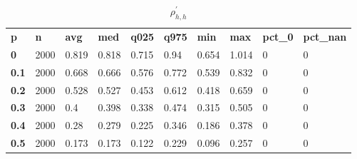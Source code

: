 \begin{table}[h]
 \centering 
\footnotesize
\caption{$\rho_{h,h}^\prime $}
\label{tab:alphahh}
\begin{tabular}[h]{| l l l l l l l l l l|
    } \hline
\textbf{ p} & \textbf{ n} & \textbf{ avg} & \textbf{ med} & \textbf{ q025} & \textbf{ q975} & \textbf{ min} & \textbf{ max} & \textbf{ pct\_0} & \textbf{ pct\_nan}
           \\
  \textbf{  0} & 2000 & 0.819 & 0.818 & 0.715 &  0.94 & 0.654 & 1.014 & 0 & 0
           \\
  \textbf{0.1} & 2000 & 0.668 & 0.666 & 0.576 & 0.772 & 0.539 & 0.832 & 0 & 0
           \\
  \textbf{0.2} & 2000 & 0.528 & 0.527 & 0.453 & 0.612 & 0.418 & 0.659 & 0 & 0
           \\
  \textbf{0.3} & 2000 &   0.4 & 0.398 & 0.338 & 0.474 & 0.315 & 0.505 & 0 & 0
           \\
  \textbf{0.4} & 2000 &  0.28 & 0.279 & 0.225 & 0.346 & 0.186 & 0.378 & 0 & 0
           \\
  \textbf{0.5} & 2000 & 0.173 & 0.173 & 0.122 & 0.229 & 0.096 & 0.257 & 0 & 0
           \\
 \hline \end{tabular}
 \end{table}
